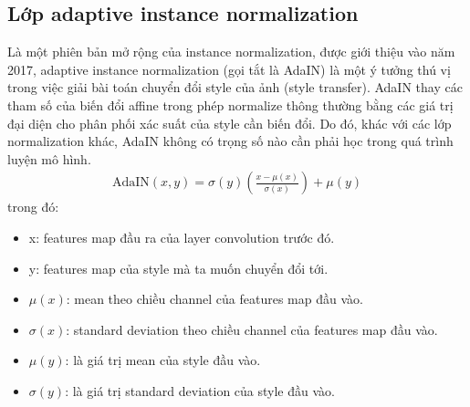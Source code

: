 {    \subsection{Lớp adaptive instance normalization}
    Là một phiên bản mở rộng của instance normalization, được giới thiệu vào năm 2017, adaptive instance normalization (gọi tắt là AdaIN) \cite{adain} là một ý tưởng thú vị trong việc giải bài toán chuyển đổi style của ảnh (style transfer). AdaIN thay các tham số của biến đổi affine trong phép normalize thông thường bằng các giá trị đại diện cho phân phối xác suất của style cần biến đổi. Do đó, khác với các lớp normalization khác, AdaIN không có trọng số nào cần phải học trong quá trình luyện mô hình.
    \begin{align}
    \textrm{AdaIN}(x, y)= \sigma(y)\left(\frac{x-\mu(x)}{\sigma(x)}\right)+\mu(y)
    \end{align}
	\noindent trong đó:
	\begin{itemize}[leftmargin=0cm,itemindent=.5cm,labelwidth=\itemindent,labelsep=0cm,align=left]
        \item x: features map đầu ra của layer convolution trước đó.
        \item y: features map của style mà ta muốn chuyển đổi tới.
        \item $\mu(x)$: mean theo chiều channel của features map đầu vào.
        \item $\sigma(x)$: standard deviation theo chiều channel của features map đầu vào.
        \item $\mu(y)$: là giá trị mean của style đầu vào.
        \item $\sigma(y)$: là giá trị standard deviation của style đầu vào.
    \end{itemize}

}
